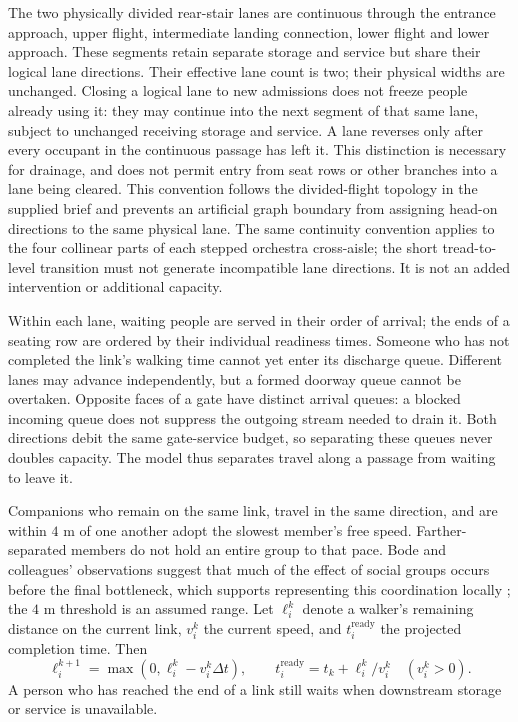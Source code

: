 \documentclass[11pt,a4paper]{article}
\begin{document}
The two physically divided rear-stair lanes are continuous through the entrance approach, upper flight, intermediate landing connection, lower flight and lower approach. These segments retain separate storage and service but share their logical lane directions. Their effective lane count is two; their physical widths are unchanged. Closing a logical lane to new admissions does not freeze people already using it: they may continue into the next segment of that same lane, subject to unchanged receiving storage and service. A lane reverses only after every occupant in the continuous passage has left it. This distinction is necessary for drainage, and does not permit entry from seat rows or other branches into a lane being cleared. This convention follows the divided-flight topology in the supplied brief and prevents an artificial graph boundary from assigning head-on directions to the same physical lane. The same continuity convention applies to the four collinear parts of each stepped orchestra cross-aisle; the short tread-to-level transition must not generate incompatible lane directions. It is not an added intervention or additional capacity.

Within each lane, waiting people are served in their order of arrival; the ends of a seating row are ordered by their individual readiness times. Someone who has not completed the link's walking time cannot yet enter its discharge queue. Different lanes may advance independently, but a formed doorway queue cannot be overtaken. Opposite faces of a gate have distinct arrival queues: a blocked incoming queue does not suppress the outgoing stream needed to drain it. Both directions debit the same gate-service budget, so separating these queues never doubles capacity. The model thus separates travel along a passage from waiting to leave it.

Companions who remain on the same link, travel in the same direction, and are within $4$ m of one another adopt the slowest member's free speed. Farther-separated members do not hold an entire group to that pace. Bode and colleagues' observations suggest that much of the effect of social groups occurs before the final bottleneck, which supports representing this coordination locally \cite{bode}; the $4$ m threshold is an assumed range. Let $\ell_i^k$ denote a walker's remaining distance on the current link, $v_i^k$ the current speed, and $t_i^{\mathrm{ready}}$ the projected completion time. Then
\begin{equation}\label{eq:remaining}
\ell_i^{k+1}=\max(0,\ell_i^k-v_i^k\Delta t),\qquad
t_i^{\mathrm{ready}}=t_k+\ell_i^k/v_i^k\quad(v_i^k>0).
\end{equation}
A person who has reached the end of a link still waits when downstream storage or service is unavailable. 
\end{document}
